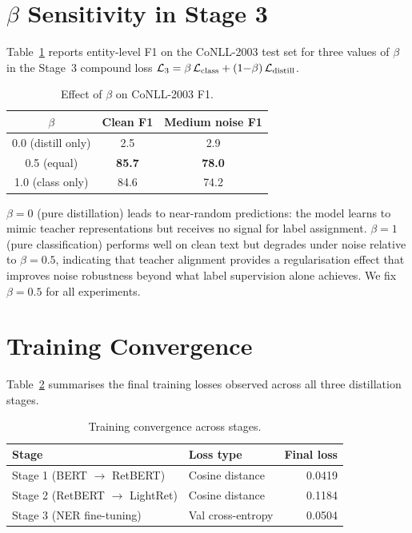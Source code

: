 \appendix

\section{$\beta$ Sensitivity in Stage 3}
\label{app:beta}

Table~\ref{tab:beta} reports entity-level F1 on the CoNLL-2003 test set for
three values of $\beta$ in the Stage~3 compound loss
$\mathcal{L}_3 = \beta\,\mathcal{L}_{\text{class}} + (1{-}\beta)\,\mathcal{L}_{\text{distill}}$.

\begin{table}[h]
\centering
\caption{Effect of $\beta$ on CoNLL-2003 F1.}
\label{tab:beta}
\begin{tabular}{ccc}
\toprule
$\beta$ & \textbf{Clean F1} & \textbf{Medium noise F1} \\
\midrule
0.0 (distill only) & 2.5  & 2.9  \\
0.5 (equal)        & \textbf{85.7} & \textbf{78.0} \\
1.0 (class only)   & 84.6 & 74.2 \\
\bottomrule
\end{tabular}
\end{table}

$\beta{=}0$ (pure distillation) leads to near-random predictions: the model
learns to mimic teacher representations but receives no signal for label
assignment. $\beta{=}1$ (pure classification) performs well on clean text
but degrades under noise relative to $\beta{=}0.5$, indicating that teacher
alignment provides a regularisation effect that improves noise robustness
beyond what label supervision alone achieves. We fix $\beta{=}0.5$ for all
experiments.

\section{Training Convergence}
\label{app:convergence}

Table~\ref{tab:convergence} summarises the final training losses observed
across all three distillation stages.

\begin{table}[h]
\centering
\caption{Training convergence across stages.}
\label{tab:convergence}
\begin{tabular}{llr}
\toprule
\textbf{Stage} & \textbf{Loss type} & \textbf{Final loss} \\
\midrule
Stage 1 (BERT $\to$ RetBERT)      & Cosine distance & 0.0419 \\
Stage 2 (RetBERT $\to$ LightRet)  & Cosine distance & 0.1184 \\
Stage 3 (NER fine-tuning)         & Val cross-entropy & 0.0504 \\
\bottomrule
\end{tabular}
\end{table}

